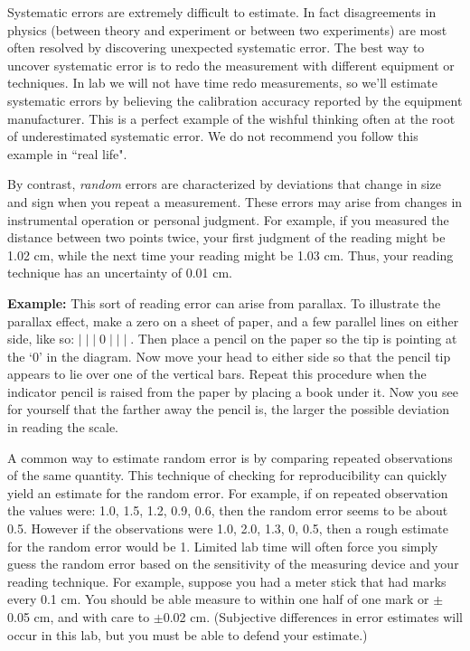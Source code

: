     Systematic errors are extremely difficult to estimate.
In fact disagreements in physics
(between theory and experiment or between two experiments)
are most often resolved by discovering unexpected systematic error.
The best way to uncover systematic error is to redo the
measurement with different equipment or techniques.  In lab
we will not have time redo measurements, so we'll estimate
systematic errors by believing the calibration accuracy reported
by the equipment manufacturer.  This is a perfect example of the
wishful thinking often at the root of underestimated systematic error.
We do not recommend you follow this example in ``real life".

     By contrast, {\em random} errors are characterized by 
deviations that change in size and sign when you repeat a
measurement.  These errors may arise from changes in instrumental
operation or personal judgment.  For example, if you measured the
distance between two points twice, your first judgment of the
reading might be 1.02 cm, while the next time your reading might
be 1.03 cm.  Thus, your reading technique has an uncertainty of 0.01 cm.

     {\bf Example: } This sort of reading error can arise from parallax.  To
illustrate the parallax effect, make a zero on a sheet of paper, and
a few parallel lines on either side, like so: $|\;|\;|\;0\;|\;|\;|\;$.
Then place a pencil on the paper so the
tip is pointing at the `0' in the diagram.  Now
move your head to either side so that the pencil tip appears to
lie over one of the vertical bars.  Repeat this procedure when the indicator
pencil is raised from the paper by placing a book under it.  Now
you see for yourself that the farther away the pencil is, the
larger the possible deviation in reading the scale.



A common way to estimate 
random error is by comparing repeated observations of the
same quantity.  This technique of checking for reproducibility
can quickly yield an estimate for the random error.  For example,
if on repeated observation the values were: 1.0, 1.5, 1.2, 0.9,
0.6, then the random error seems to be about 0.5.  However if the
observations were 1.0, 2.0, 1.3, 0, 0.5, then a rough estimate
for the random error would be 1.  
Limited lab time will often force you simply guess the random error
based on the
sensitivity of the measuring device and your reading technique.  For
example, suppose you had a meter stick that had marks every 0.1
cm.  You should be able measure  to within one
half of one mark or $\pm$0.05 cm, and with care to $\pm$0.02 cm.
(Subjective differences in error estimates will occur in this lab, but you 
must be able to defend your estimate.)

